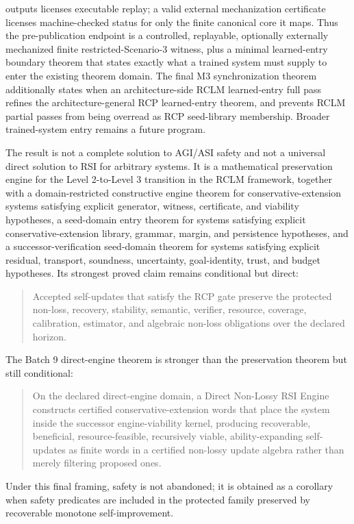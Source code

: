 \documentclass[11pt]{article}
\newcommand{\1}{\mathbf{1}}
\begin{document}
outputs licenses executable replay; a valid external mechanization certificate licenses machine-checked status for only the finite canonical core it maps. Thus the pre-publication endpoint is a controlled, replayable, optionally externally mechanized finite restricted-Scenario-3 witness, plus a minimal learned-entry boundary theorem that states exactly what a trained system must supply to enter the existing theorem domain. The final M3 synchronization theorem additionally states when an architecture-side RCLM learned-entry full pass refines the architecture-general RCP learned-entry theorem, and prevents RCLM partial passes from being overread as RCP seed-library membership. Broader trained-system entry remains a future program.

The result is not a complete solution to AGI/ASI safety and not a universal direct solution to RSI for arbitrary systems. It is a mathematical preservation engine for the Level 2-to-Level 3 transition in the RCLM framework, together with a domain-restricted constructive engine theorem for conservative-extension systems satisfying explicit generator, witness, certificate, and viability hypotheses, a seed-domain entry theorem for systems satisfying explicit conservative-extension library, grammar, margin, and persistence hypotheses, and a successor-verification seed-domain theorem for systems satisfying explicit residual, transport, soundness, uncertainty, goal-identity, trust, and budget hypotheses. Its strongest proved claim remains conditional but direct:
\begin{quote}
Accepted self-updates that satisfy the RCP gate preserve the protected non-loss, recovery, stability, semantic, verifier, resource, coverage, calibration, estimator, and algebraic non-loss obligations over the declared horizon.
\end{quote}
The Batch 9 direct-engine theorem is stronger than the preservation theorem but still conditional:
\begin{quote}
On the declared direct-engine domain, a Direct Non-Lossy RSI Engine constructs certified conservative-extension words that place the system inside the successor engine-viability kernel, producing recoverable, beneficial, resource-feasible, recursively viable, ability-expanding self-updates as finite words in a certified non-lossy update algebra rather than merely filtering proposed ones.
\end{quote}
Under this final framing, safety is not abandoned; it is obtained as a corollary when safety predicates are included in the protected family preserved by recoverable monotone self-improvement.
\end{document}
